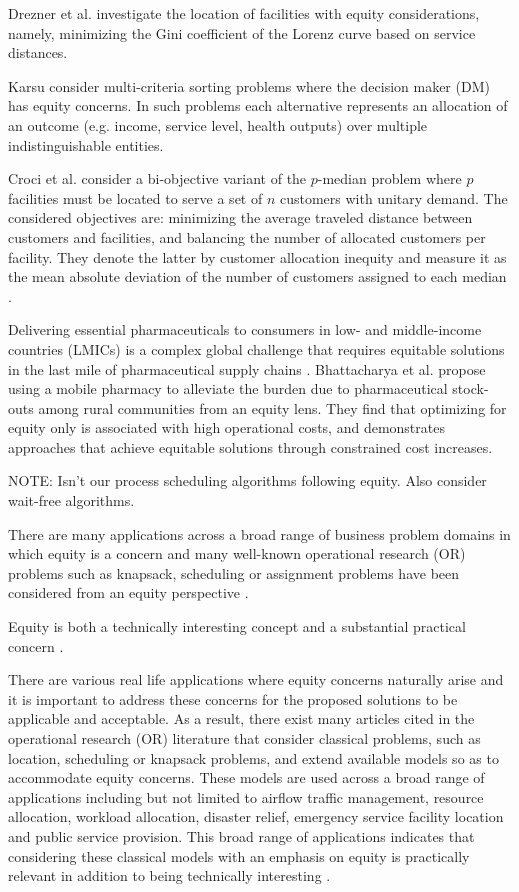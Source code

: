 Drezner et al. \cite{drezner2009equitable} investigate the location of facilities with equity considerations, namely, minimizing the Gini coefficient of the Lorenz curve based on service distances.

Karsu \cite{karsu2016approaches} consider multi-criteria sorting problems where the decision maker (DM) has equity concerns. In such problems each alternative represents an allocation of an outcome (e.g. income, service level, health outputs) over multiple indistinguishable entities.

Croci et al. \cite{croci2023balanced} consider a bi-objective variant of the $p$-median problem where $p$ facilities must be located to serve a set of $n$ customers with unitary demand. The considered objectives are: minimizing the average traveled distance between customers and facilities, and balancing the number of allocated customers per facility. They denote the latter by customer allocation inequity and measure it as the mean absolute deviation of the number of customers assigned to each median \cite{croci2023balanced}.

Delivering essential pharmaceuticals to consumers in low- and middle-income countries (LMICs) is a complex global challenge that requires equitable solutions in the last mile of pharmaceutical supply chains \cite{bhattacharya2023mathematical}. Bhattacharya et al. \cite{bhattacharya2023mathematical} propose using a mobile pharmacy to alleviate the burden due to pharmaceutical stock-outs among rural communities from an equity lens. They find that optimizing for equity only is associated with high operational costs, and demonstrates approaches that achieve equitable solutions through constrained cost increases.

NOTE: Isn't our process scheduling algorithms following equity. Also consider wait-free algorithms.

There are many applications across a broad range of business problem domains in which equity is a concern and many well-known operational research (OR) problems such as knapsack, scheduling or assignment problems have been considered from an equity perspective \cite{karsu2015inequity}.

Equity is both a technically interesting concept and a substantial practical concern \cite{karsu2015inequity}.

There are various real life applications where equity concerns naturally arise and it is important to address these concerns for the proposed solutions to be applicable and acceptable. As a result, there exist many articles cited in the operational research (OR) literature that consider classical problems, such as location, scheduling or knapsack problems, and extend available models so as to accommodate equity concerns. These models are used across a broad range of applications including but not limited to airflow traffic management, resource allocation, workload allocation, disaster relief, emergency service facility location and public service provision. This broad range of applications indicates that considering these classical models with an emphasis on equity is practically relevant in addition to being technically interesting \cite{karsu2015inequity}.

